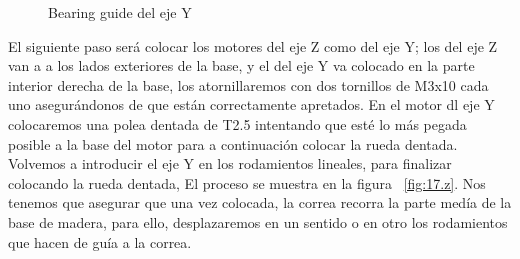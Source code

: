\begin{figure}[H]
\begin{subfigure}[htb]{0.5\textwidth}
		                \label{fig:12.z}
		        \end{subfigure}
		        \caption{Bearing guide del eje Y}\label{fig:13.z}
		\end{figure}
		El siguiente paso será colocar los motores del eje Z como del eje Y; los del eje Z van a a los lados exteriores de la base, y el del eje Y va colocado en la parte interior derecha de la base, los atornillaremos con dos tornillos de M3x10 cada uno asegurándonos de que están correctamente apretados. En el motor dl eje Y colocaremos una polea dentada de T2.5 intentando que esté lo más pegada posible a la base del motor para a continuación colocar la rueda dentada. Volvemos a introducir el eje Y en los rodamientos lineales, para finalizar colocando la rueda dentada, El proceso se muestra en la figura ~\ref{fig:17.z}. Nos tenemos que asegurar que una vez colocada, la correa recorra la parte medía de la base de madera, para ello, desplazaremos en un sentido o en otro los rodamientos que hacen de guía a la correa.
